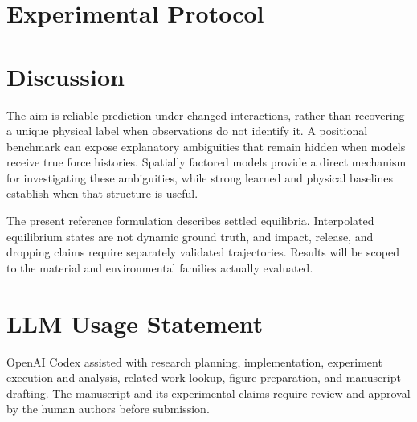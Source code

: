 \documentclass[10pt,twocolumn,letterpaper]{article}
\begin{document}
\section{Experimental Protocol}


\section{Discussion}
The aim is reliable prediction under changed interactions, rather than recovering a unique physical label when observations do not identify it. A positional benchmark can expose explanatory ambiguities that remain hidden when models receive true force histories. Spatially factored models provide a direct mechanism for investigating these ambiguities, while strong learned and physical baselines establish when that structure is useful.

The present reference formulation describes settled equilibria. Interpolated equilibrium states are not dynamic ground truth, and impact, release, and dropping claims require separately validated trajectories. Results will be scoped to the material and environmental families actually evaluated.

\section*{LLM Usage Statement}
OpenAI Codex assisted with research planning, implementation, experiment execution and analysis, related-work lookup, figure preparation, and manuscript drafting. The manuscript and its experimental claims require review and approval by the human authors before submission.

{\small}
\end{document}
